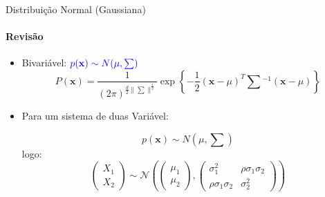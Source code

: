 \documentclass{beamer}
\begin{document}
\begin{frame}{Distribuição Normal (Gaussiana)}
    \framesubtitle{Revisão}
    \begin{itemize}
        \item Bivariável: $\color{blue}{p(\mathbf{x}) \sim N(\mu, \textstyle\sum)}$
    \begin{equation*}
        P(\mathbf{x}) = \frac{1}{(2\pi)^{\frac{d}{2}\|\textstyle\sum\|^{\frac{1}{2}}}}\exp\left\{-\frac{1}{2} (\mathbf{x}-\mu)^T\textstyle\sum{}^{-1}(\mathbf{x}-\mu)\right\}
    \end{equation*}
    
    \item Para um sistema de duas Variável:
    
    \begin{equation*}
        p(\mathbf{x}) \sim N(\mu, \textstyle\sum)
    \end{equation*}
    logo:     
    \begin{equation*}
        \begin{pmatrix}
            X_1 \\
            X_2
        \end{pmatrix}  \sim \mathcal{N} \left( \begin{pmatrix}
            \mu_1 \\
            \mu_2
        \end{pmatrix} , \begin{pmatrix}
            \sigma^2_1 &  \rho \sigma_1 \sigma_2 \\
            \rho \sigma_1 \sigma_2 &  \sigma^2_2
        \end{pmatrix} \right)
    \end{equation*}
    \end{itemize}
\end{frame}
\end{document}
